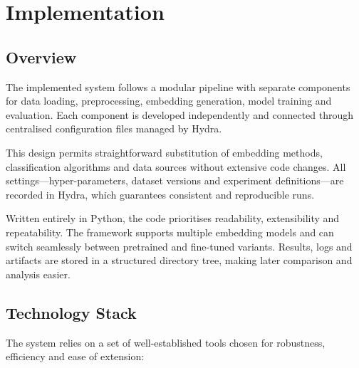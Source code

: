 \documentclass{SGGW-thesis-EN}
\begin{document}
\chapter{Implementation}

\section{Overview}
The implemented system follows a modular pipeline with separate components for data loading, preprocessing,
embedding generation, model training and evaluation. Each component is developed independently and connected through
centralised configuration files managed by Hydra.

This design permits straightforward substitution of embedding methods, classification algorithms and data sources
without extensive code changes. All settings—hyper-parameters, dataset versions and experiment definitions—are recorded
in Hydra, which guarantees consistent and reproducible runs.

Written entirely in Python, the code prioritises readability, extensibility and repeatability. The framework supports
multiple embedding models and can switch seamlessly between pretrained and fine-tuned variants. Results, logs and
artifacts are stored in a structured directory tree, making later comparison and analysis easier.


\section{Technology Stack}
The system relies on a set of well-established tools chosen for robustness, efficiency and ease of extension:
\end{document}
